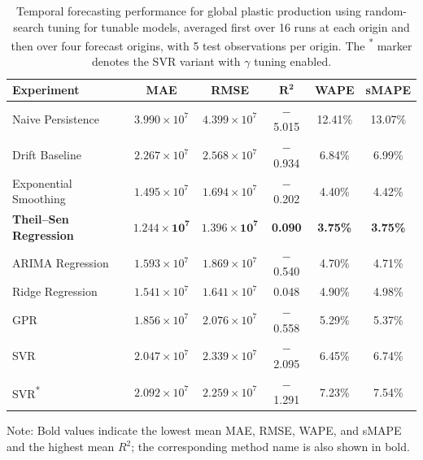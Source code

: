 \begin{table}[H]
	\caption{Temporal forecasting performance for global plastic production using random-search tuning for tunable models, averaged first over 16 runs at each origin and then over four forecast origins, with 5 test observations per origin. The \textsuperscript{*} marker denotes the SVR variant with \(\gamma\) tuning enabled.}
	\begin{tabularx}{\textwidth}{lccccc}
		\toprule
		\textbf{Experiment} & \textbf{MAE} & \textbf{RMSE} & $\mathbf{R^2}$ & \textbf{WAPE} & \textbf{sMAPE} \\
		\midrule
		Naive Persistence & \(3.990 \times 10^{7}\) & \(4.399 \times 10^{7}\) & $-$5.015 & 12.41\% & 13.07\% \\
		Drift Baseline & \(2.267 \times 10^{7}\) & \(2.568 \times 10^{7}\) & $-$0.934 & 6.84\% & 6.99\% \\
		Exponential Smoothing & \(1.495 \times 10^{7}\) & \(1.694 \times 10^{7}\) & $-$0.202 & 4.40\% & 4.42\% \\
		\textbf{Theil--Sen Regression} & \(\mathbf{1.244 \times 10^{7}}\) & \(\mathbf{1.396 \times 10^{7}}\) & \textbf{0.090} & \textbf{3.75\%} & \textbf{3.75\%} \\
		ARIMA Regression & \(1.593 \times 10^{7}\) & \(1.869 \times 10^{7}\) & $-$0.540 & 4.70\% & 4.71\% \\
		Ridge Regression & \(1.541 \times 10^{7}\) & \(1.641 \times 10^{7}\) & 0.048 & 4.90\% & 4.98\% \\
		GPR & \(1.856 \times 10^{7}\) & \(2.076 \times 10^{7}\) & $-$0.558 & 5.29\% & 5.37\% \\
		SVR & \(2.047 \times 10^{7}\) & \(2.339 \times 10^{7}\) & $-$2.095 & 6.45\% & 6.74\% \\
		SVR\textsuperscript{*} & \(2.092 \times 10^{7}\) & \(2.259 \times 10^{7}\) & $-$1.291 & 7.23\% & 7.54\% \\
		\bottomrule
	\end{tabularx}
	\smallskip
	{\footnotesize
	Note: Bold values indicate the lowest mean MAE, RMSE, WAPE, and sMAPE and the highest mean \(R^2\); the corresponding method name is also shown in bold.\par
	}
	\label{tab:global_forecasting_random_search_metrics}
\end{table}

